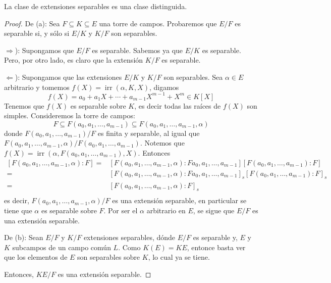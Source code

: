 \documentclass[12pt]{report}
\theoremstyle{largebreak}
\DeclareMathOperator{\irr}{irr}
\begin{document}
    \begin{theor}
        La clase de extensiones separables es una clase distinguida.
    \end{theor}

    \begin{proof}
        De (a): Sea $F\subseteq K\subseteq E$ una torre de campos. Probaremos que $E/F$ es separable si, y sólo si $E/K$ y $K/F$ son separables.

        $\Rightarrow$): Supongamos que $E/F$ es separable. Sabemos ya que $E/K$ es separable. Pero, por otro lado, es claro que la extensión $K/F$ es separable.

        $\Leftarrow$): Supongamos que las extensiones $E/K$ y $K/F$ son separables. Sea $\alpha\in E$ arbitrario y tomemos $f(X)=\irr(\alpha, K, X)$, digamos
        \begin{equation*}
            f(X)=a_0+a_1X+\cdots+a_{m-1}X^{m-1}+X^m\in K[X]
        \end{equation*}
        Tenemos que $f(X)$ es separable sobre $K$, es decir todas las raíces de $f(X)$ son simples. Consideremos la torre de campos:
        \begin{equation*}
            F\subseteq F(a_0,a_1,\dots,a_{m-1})\subseteq F(a_0,a_1,\dots,a_{m-1},\alpha)
        \end{equation*}
        donde $F(a_0,a_1,\dots,a_{m-1})/F$ es finita y separable, al igual que $F(a_0,a_1,\dots,a_{m-1},\alpha)/F(a_0,a_1,\dots,a_{m-1})$. Notemos que $f(X)=\irr(\alpha, F(a_0,a_1,\dots,a_{m-1}), X)$. Entonces
        \begin{equation*}
            \begin{split}
                \left[F(a_0,a_1,\dots,a_{m-1},\alpha):F\right]=&\left[F(a_0,a_1,\dots,a_{m-1},\alpha):Fa_0,a_1,\dots,a_{m-1}\right]\left[F(a_0,a_1,\dots,a_{m-1}):F\right]\\
                =&\left[F(a_0,a_1,\dots,a_{m-1},\alpha):Fa_0,a_1,\dots,a_{m-1}\right]_s\left[F(a_0,a_1,\dots,a_{m-1}):F\right]_s\\
                =&\left[F(a_0,a_1,\dots,a_{m-1},\alpha):F\right]_s\\
            \end{split}
        \end{equation*}
        es decir, $F(a_0,a_1,\dots,a_{m-1},\alpha)/F$ es una extensión separable, en particular se tiene que $\alpha$ es separable sobre $F$. Por ser el $\alpha$ arbitrario en $E$, se sigue que $E/F$ es una extensión separable.

        De (b): Sean $E/F$ y $K/F$ extensiones separables, dónde $E/F$ es separable y, $E$ y $K$ subcampos de un campo común $L$. Como $K(E)=KE$, entonce basta ver que  los elementos de $E$ son separables sobre $K$, lo cual ya se tiene.

        Entonces, $KE/F$ es una extensión separable.
    \end{proof}
\end{document}
